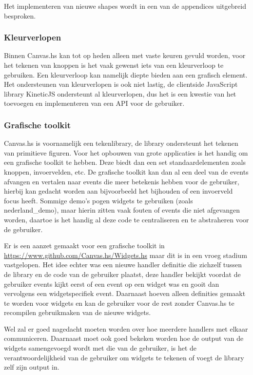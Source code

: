 Het implementeren van nieuwe shapes wordt in een van de appendices uitgebreid besproken.

\subsubsection{Kleurverlopen}
Binnen Canvas.hs kan tot op heden alleen met vaste keuren gevuld worden, voor het tekenen van knoppen is het vaak gewenst iets van een kleurverloop te gebruiken. Een kleurverloop kan namelijk diepte bieden aan een grafisch element. Het ondersteunen van kleurverlopen is ook niet lastig, de clientside JavaScript library KineticJS ondersteunt al kleurverlopen, dus het is een kwestie van het toevoegen en implementeren van een API voor de gebruiker.

\subsubsection{Grafische toolkit}
Canvas.hs is voornamelijk een tekenlibrary, de library ondersteunt het tekenen van primitieve figuren. Voor het opbouwen van grote applicaties is het handig om een grafische toolkit te hebben. Deze biedt dan een set standaardelementen zoals knoppen, invoervelden, etc. De grafische toolkit kan dan al een deel van de events afvangen en vertalen naar events die meer betekenis hebben voor de gebruiker, hierbij kan gedacht worden aan bijvoorbeeld het bijhouden of een invoerveld focus heeft. Sommige demo's pogen widgets te gebruiken (zoals nederland\_demo), maar hierin zitten vaak fouten of events die niet afgevangen worden, daartoe is het handig al deze code te centraliseren en te abstraheren voor de gebruiker.

Er is een aanzet gemaakt voor een grafische toolkit in \url{https://www.github.com/Canvas.hs/Widgets.hs} maar dit is in een vroeg stadium vastgelopen. Het idee echter was een nieuwe handler definitie die zichzelf tussen de library en de code van de gebruiker plaatst, deze handler bekijkt voordat de gebruiker events kijkt eerst of een event op een widget was en gooit dan vervolgens een widgetspecifiek event. Daarnaast hoeven alleen definities gemaakt te worden voor widgets en kan de gebruiker voor de rest zonder Canvas.hs te recompilen gebruikmaken van de nieuwe widgets.

Wel zal er goed nagedacht moeten worden over hoe meerdere handlers met elkaar communiceren. Daarnaast moet ook goed bekeken worden hoe de output van de widgets samengevoegd wordt met die van de gebruiker, is het de verantwoordelijkheid van de gebruiker om widgets te tekenen of voegt de library zelf zijn output in.


